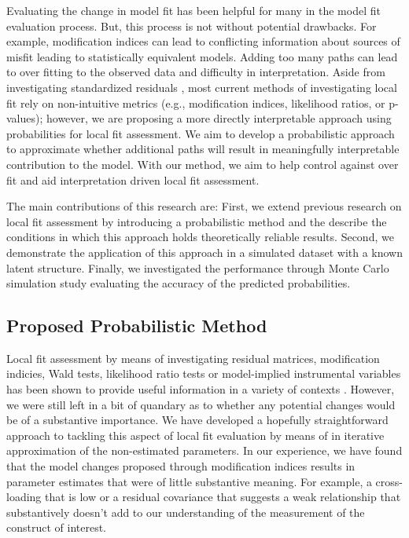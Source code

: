\documentclass[man, noextraspace, floatsintext, 12pt]{apa7}
\begin{document}
Evaluating the change in model fit has been helpful for many in the model fit evaluation process. 
But, this process is not without potential drawbacks.
For example, modification indices can lead to conflicting information about sources of misfit leading to statistically equivalent models.
Adding too many paths can lead to over fitting to the observed data and difficulty in interpretation.
Aside from investigating standardized residuals \citep{Maydeu2017}, most current methods of investigating local fit rely on non-intuitive metrics (e.g., modification indices, likelihood ratios, or p-values); however, we are proposing a more directly interpretable approach using probabilities for local fit assessment. 
We aim to develop a probabilistic approach to approximate whether additional paths will result in meaningfully interpretable contribution to the model.
With our method, we aim to help control against over fit and aid interpretation driven local fit assessment.

The main contributions of this research are: First, we extend previous research on local fit assessment by introducing a probabilistic method and the describe the conditions in which this approach holds theoretically reliable results. 
Second, we demonstrate the application of this approach in a simulated dataset with a known latent structure.
Finally, we investigated the performance through Monte Carlo simulation study evaluating the accuracy of the predicted probabilities.

\subsection{Proposed Probabilistic Method}

Local fit assessment by means of investigating residual matrices, modification indicies, Wald tests, likelihood ratio tests or model-implied instrumental variables has been shown to provide useful information in a variety of contexts \citep{Chou1990, Whittaker2012, Maydeu2017}.
However, we were still left in a bit of quandary as to whether any potential changes would be of a substantive importance.
We have developed a hopefully straightforward approach to tackling this aspect of local fit evaluation by means of in iterative approximation of the non-estimated parameters.
In our experience, we have found that the model changes proposed through modification indices results in parameter estimates that were of little substantive meaning.
For example, a cross-loading that is low or a residual covariance that suggests a weak relationship that substantively doesn't add to our understanding of the measurement of the construct of interest.
\end{document}
